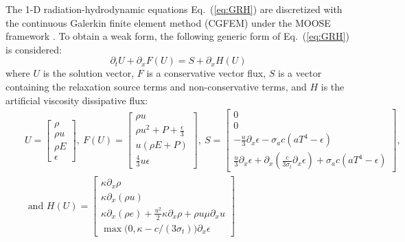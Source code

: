 \documentclass[review]{elsarticle}
\newcommand{\eqt}[1]{Eq.~(\ref{#1})}                     %
\begin{document}
The 1-D radiation-hydrodynamic equations \eqt{eq:GRH} are discretized with the continuous Galerkin finite element method (CGFEM) under the MOOSE framework \cite{Moose}. To obtain a weak form, the following generic form of \eqt{eq:GRH} is considered:
\begin{equation}
\label{eq:form}
\partial_t U + \partial_x F \left( U \right) = S + \partial_x H \left(U\right)
\end{equation}
where $U$ is the solution vector, $F$ is a conservative vector flux, $S$ is a vector containing the relaxation source terms and non-conservative terms, and $H$ is the artificial viscosity dissipative flux:
\begin{eqnarray*}
&&U = 
\begin{bmatrix}
\rho \\
\rho u \\
\rho E \\
\epsilon
\end{bmatrix}
,\
F(U) = 
\begin{bmatrix}
\rho u \\
\rho u^2 + P + \frac{\epsilon}{3} \\
u \left( \rho E + P \right) \\
\frac{4}{3} u \epsilon
\end{bmatrix}
,\
S = 
\begin{bmatrix}
0 \\
0 \\
-\frac{u}{3} \partial_x \epsilon - \sigma_a c \left( a T^4 - \epsilon \right) \\
\frac{u}{3} \partial_x \epsilon + \partial_x \left( \frac{c}{3 \sigma_t} \partial_x \epsilon \right) + \sigma_a c \left( a T^4 - \epsilon \right)
\end{bmatrix}
,
\\
&&\text{ and } 
H(U) = 
\begin{bmatrix}
\kappa \partial_x \rho \\
\kappa \partial_x (\rho u) \\
\kappa \partial_x \left( \rho e \right) + \frac{u^2}{2} \kappa \partial_x \rho + \rho u \mu \partial_x u \\
\max \big( 0, \kappa- c/(3 \sigma_t) \big) \partial_x \epsilon 
\end{bmatrix}
\end{eqnarray*}
\end{document}
